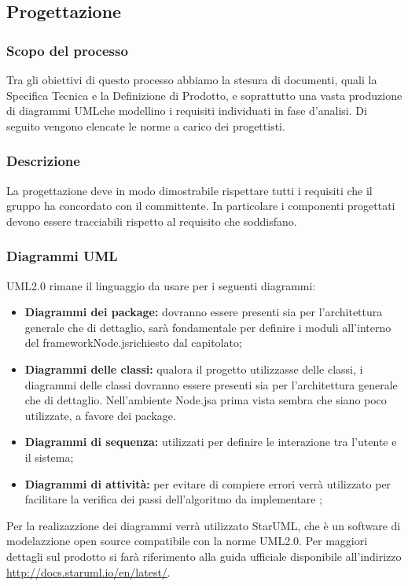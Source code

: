 \documentclass[a4paper,11pt]{article}
\begin{document}
		\subsection{ Progettazione}
			\subsubsection{ Scopo del processo}
			Tra gli obiettivi di questo processo abbiamo la stesura di documenti, quali la Specifica Tecnica e la Definizione di Prodotto, e soprattutto una vasta produzione di diagrammi UML\addglos che modellino i requisiti individuati in fase d'analisi. Di seguito vengono elencate le norme a carico dei progettisti.
			\subsubsection{ Descrizione}
			La progettazione deve in modo dimostrabile rispettare tutti i requisiti che il gruppo ha concordato con il committente. In particolare i componenti progettati devono essere tracciabili rispetto al requisito che soddisfano.
			\subsubsection{ Diagrammi UML}
			UML2.0 rimane il linguaggio da usare per i seguenti diagrammi:
			\begin{itemize}
			\item\textbf{Diagrammi dei package\addglos:} dovranno essere presenti sia per l'architettura generale che di dettaglio, sarà fondamentale per definire i moduli all'interno del framework\addglos Node.js\addglos richiesto dal capitolato;
			\item\textbf{Diagrammi delle classi:} qualora il progetto utilizzasse delle classi, i diagrammi delle classi dovranno essere presenti sia per l'architettura generale che di dettaglio. Nell'ambiente Node.js\addglos a prima vista sembra che siano poco utilizzate, a favore dei package\addglos.
			\item\textbf{Diagrammi di sequenza:} utilizzati per definire le interazione tra l'utente e il sistema;
			\item\textbf{Diagrammi di attività:} per evitare di compiere errori verrà utilizzato per facilitare la verifica dei passi dell'algoritmo da implementare ;
			\end{itemize}
			Per la realizazzione dei diagrammi verrà utilizzato StarUML\addglos, che è un software di modelazzione open source compatibile con la norme UML2.0. Per maggiori dettagli sul prodotto si farà riferimento alla guida ufficiale disponibile all'indirizzo \url{http://docs.staruml.io/en/latest/}.
\end{document}
